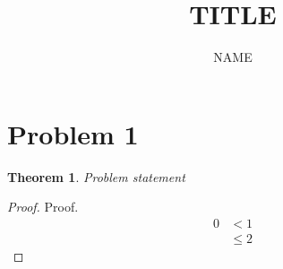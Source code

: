 \documentclass{article}
\title{TITLE}
\author{NAME}
\newtheorem*{theorem}{Theorem}
\begin{document}
	\section*{Problem 1}
    \begin{theorem}
        Problem statement
    \end{theorem}
    \begin{proof}
        Proof.
        \begin{align*}
            0 &< 1 \tag{Annotation} \\
            &\leq 2 
        \end{align*}
    \end{proof}
	
	
\end{document}
